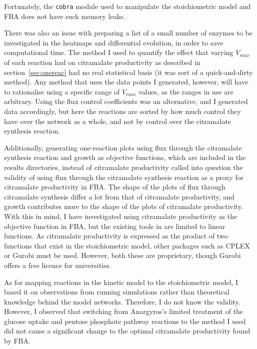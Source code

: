 \documentclass[parskip=full]{scrreprt}
\begin{document}
Fortunately, the \texttt{cobra} module used to manipulate the stoichiometric model and FBA does not have such memory leaks.

There was also an issue with preparing a list of a small number of enzymes to be investigated in the heatmaps and differential evolution, in order to save computational time. The method I used to quantify the effect that varying $V_{max}$ of each reaction had on citramalate productivity as described in section~\ref{sec:onereac} had no real statistical basis (it was sort of a quick-and-dirty method). Any method that uses the data points I generated, however, will have to rationalise using a specific range of $V_{max}$ values, as the ranges in use are arbitrary. Using the flux control coefficients was an alternative, and I generated data accordingly, but here the reactions are sorted by how much control they have over the network as a whole, and not by control over the citramalate synthesis reaction.

Additionally, generating one-reaction plots using flux through the citramalate synthesis reaction and growth as objective functions, which are included in the results directories, instead of citramalate productivity called into question the validity of using flux through the citramalate synthesis reaction as a proxy for citramalate productivity in FBA. The shape of the plots of flux through citramalate synthesis differ a lot from that of citramalate productivity, and growth contributes more to the shape of the plots of citramalate productivity. With this in mind, I have investigated using citramalate productivity as the objective function in FBA, but the existing tools in  are limited to linear functions. As citramalate productivity is expressed as the product of two functions that exist in the stoichiometric model, other packages such as CPLEX or Gurobi must be used. However, both these are proprietary, though Gurobi offers a free licence for universities.

As for mapping reactions in the kinetic model to the stoichiometric model, I based it on observations from running simulations rather than theoretical knowledge behind the model networks. Therefore, I do not know the validity. However, I observed that switching from Anargyros's limited treatment of the glucose uptake and pentose phosphate pathway reactions to the method I used did not cause a significant change to the optimal citramalate productivity found by FBA.
\end{document}
